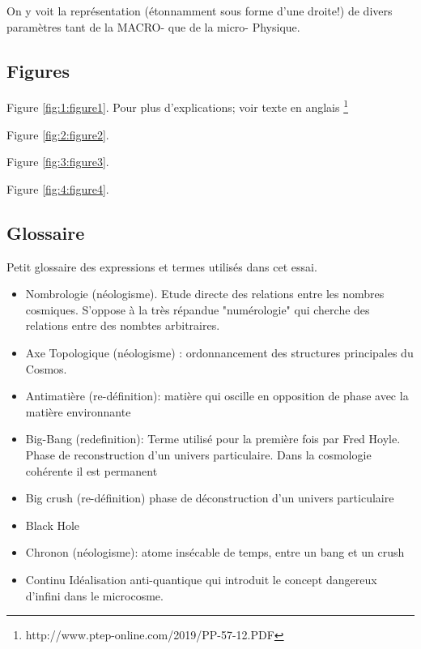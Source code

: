 \documentclass[a4paper,12pt]{article}
\begin{document}
On y voit la représentation (étonnamment sous forme d'une droite!) de divers paramètres tant de la MACRO- que de la micro- Physique.


\subsection{Figures}

Figure \ref{fig:1:figure1}. Pour plus d'explications; voir texte en anglais \footnote{http://www.ptep-online.com/2019/PP-57-12.PDF}

Figure \ref{fig:2:figure2}.

Figure \ref{fig:3:figure3}.

Figure \ref{fig:4:figure4}.


\begin{appendix}


\section{Glossaire}

Petit glossaire des expressions et termes utilisés dans cet essai.

\begin{itemize}

\item Nombrologie (néologisme). Etude directe des relations entre les nombres cosmiques. S'oppose à la très répandue "numérologie" qui cherche des relations entre des nombtes arbitraires.
\item Axe Topologique (néologisme) : ordonnancement des structures principales du Cosmos.
\item Antimatière (re-définition): matière qui oscille en opposition de phase avec la matière environnante
\item Big-Bang (redefinition): Terme utilisé pour la première fois par Fred Hoyle. Phase de reconstruction d’un univers particulaire. Dans la cosmologie cohérente il est permanent
\item Big crush (re-définition) phase de déconstruction d’un univers particulaire
\item Black Hole
\item Chronon (néologisme): atome insécable de temps, entre un bang et un crush

\item Continu Idéalisation anti-quantique qui introduit le concept dangereux d'infini dans le microcosme.



\end{itemize}
\end{appendix}
\end{document}
